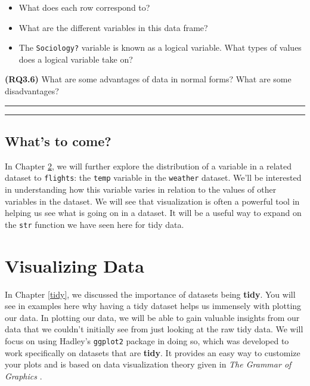 \documentclass[]{tufte-book}
\let\oldrule=\rule
\renewcommand{\rule}[1]{\oldrule{\linewidth}}
\providecommand{\tightlist}{%
  \setlength{\itemsep}{0pt}\setlength{\parskip}{0pt}}
\begin{document}
\begin{itemize}
\tightlist
\item
  What does each row correspond to?\\
\item
  What are the different variables in this data frame?\\
\item
  The \texttt{Sociology?} variable is known as a logical variable. What
  types of values does a logical variable take on?
\end{itemize}

\textbf{(RQ3.6)} What are some advantages of data in normal forms? What
are some disadvantages?

\begin{center}\rule{0.5\linewidth}{\linethickness}\end{center}

\begin{center}\rule{0.5\linewidth}{\linethickness}\end{center}

\section{What's to come?}\label{whats-to-come}

In Chapter \ref{viz}, we will further explore the distribution of a
variable in a related dataset to \texttt{flights}: the \texttt{temp}
variable in the \texttt{weather} dataset. We'll be interested in
understanding how this variable varies in relation to the values of
other variables in the dataset. We will see that visualization is often
a powerful tool in helping us see what is going on in a dataset. It will
be a useful way to expand on the \texttt{str} function we have seen here
for tidy data.

\chapter{Visualizing Data}\label{viz}

In Chapter \ref{tidy}, we discussed the importance of datasets being
\textbf{tidy}. You will see in examples here why having a tidy dataset
helps us immensely with plotting our data. In plotting our data, we will
be able to gain valuable insights from our data that we couldn't
initially see from just looking at the raw tidy data. We will focus on
using Hadley's \texttt{ggplot2} package in doing so, which was developed
to work specifically on datasets that are \textbf{tidy}. It provides an
easy way to customize your plots and is based on data visualization
theory given in \emph{The Grammar of Graphics} \citep{wilkinson2005}.
\end{document}
